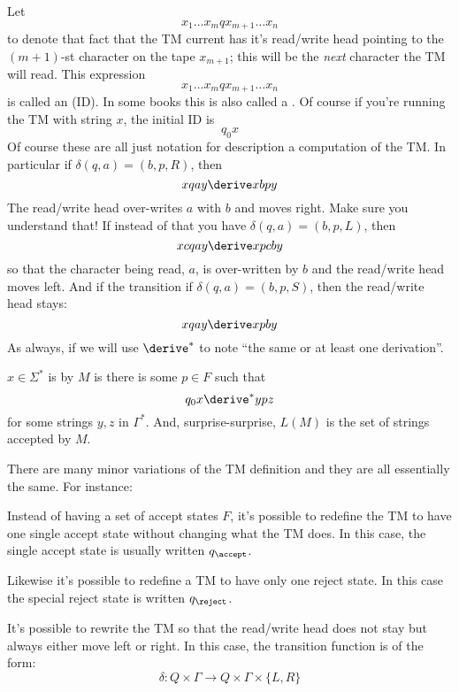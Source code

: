 \begin{defn}
Let
\[
 x_1 \ldots x_m q x_{m+1} \ldots x_n
\]
to denote that fact that the TM current has it's read/write head
pointing to the $(m+1)$-st character on the tape $x_{m+1}$; this
will be the \textit{next} character the TM will read. This expression
\[
 x_1 \ldots x_m q x_{m+1} \ldots x_n
\]
is called
an  (ID). In some books this is
also called a . Of course if you're running
the TM with string $x$, the initial ID is
\[
q_0 x
\]
Of course these are all just notation for description a computation
of the TM. In particular if $\delta(q,a) = (b,p,R)$, then
\[
 x q a y \derive xb p y
\]
The read/write head over-writes $a$ with $b$ and moves right. Make
sure you understand that! If instead of that you have $\delta(q,a) =
(b,p,L)$, then
\[
 x c q a y \derive x p c b y
\]
so that the character being read, $a$, is over-written by $b$ and
the read/write head moves left. And if the transition if
$\delta(q,a) = (b,p,S)$, then the read/write head stays:
\[
 x q a y \derive x p b y
\]
As always, if we will use $\derive^*$ to note ``the same or at
least one derivation''.
\end{defn}




 
\begin{defn}
$x \in \Sigma^*$ is  by $M$ is there is some $p
\in F$ such that
\[
 q_0 x \derive^* ypz
\]
for some strings $y,z$ in $\Gamma^*$. And, surprise-surprise, $L(M)$
is the set of strings accepted by $M$.
\end{defn}



There are many minor variations of the TM definition and they are
all essentially the same.
For instance:
\begin{tightlist}
\item Instead of having a set of accept states $F$, it's possible to redefine
the TM to have one single accept state without changing what the TM does.
In this case, the single accept state is usually written $q_\accept$.
\item Likewise it's possible to redefine a TM to have only one reject state.
In this case the special reject state is written $q_\reject$.
\item It's possible to rewrite the TM so that the read/write head does not
stay but always either move left or right.
In this case, the transition function is of the form:
\[
\delta : Q \times \Gamma \rightarrow Q 
\times \Gamma \times \{L, R\}
\]
\end{tightlist}

